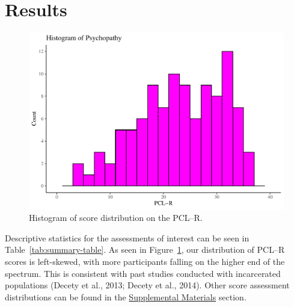 \documentclass[
  man,floatsintext]{apa7}
\begin{document}
\hypertarget{results}{%
\section{Results}\label{results}}



\begin{figure}
\includegraphics[width=1\linewidth]{d2m-Psychopathy_files/figure-latex/PCLR-descriptives-1} \caption{Histogram of score distribution on the PCL--R.}\label{fig:PCLR-descriptives}
\end{figure}

Descriptive statistics for the assessments of interest can be seen in Table~\ref{tab:summary-table}. As seen in Figure~\ref{fig:PCLR-descriptives}, our distribution of PCL--R scores is left-skewed, with more participants falling on the higher end of the spectrum. This is consistent with past studies conducted with incarcerated populations (Decety et al., 2013; Decety et al., 2014). Other score assessment distributions can be found in the \protect\hyperlink{Supplemental-Materials}{Supplemental Materials} section.
\end{document}
